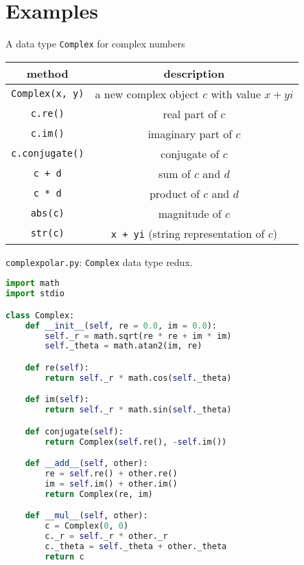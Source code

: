 \documentclass[8pt,a4paper,compress,handout]{beamer}
\begin{document}
\section{Examples}
\begin{frame}[fragile]
A data type \lstinline{Complex} for complex numbers
\begin{center}
\begin{tabular}{cc}
method & description \\ \hline
\lstinline$Complex(x, y)$ & a new complex object $c$ with value $x + yi$ \\
\lstinline$c.re()$ & real part of $c$ \\
\lstinline$c.im()$ & imaginary part of $c$ \\
\lstinline$c.conjugate()$ & conjugate of $c$ \\
\lstinline$c + d$ & sum of $c$ and $d$ \\
\lstinline$c * d$ & product of $c$ and $d$ \\
\lstinline$abs(c)$ & magnitude of $c$ \\
\lstinline$str(c)$ & \lstinline$x + yi$ (string representation of $c$)
\end{tabular} 
\end{center}
\end{frame}

\begin{frame}[fragile]
\begin{framed}
\tiny \lstinline{complexpolar.py}: \lstinline{Complex} data type redux. 
\end{framed}

\begin{lstlisting}[language=Python]
import math
import stdio

class Complex:
    def __init__(self, re = 0.0, im = 0.0):
        self._r = math.sqrt(re * re + im * im)
        self._theta = math.atan2(im, re)

    def re(self):
        return self._r * math.cos(self._theta)

    def im(self):
        return self._r * math.sin(self._theta)

    def conjugate(self):
        return Complex(self.re(), -self.im())

    def __add__(self, other):
        re = self.re() + other.re()
        im = self.im() + other.im()
        return Complex(re, im)

    def __mul__(self, other):
        c = Complex(0, 0)
        c._r = self._r * other._r
        c._theta = self._theta + other._theta
        return c
\end{lstlisting}
\end{frame}
\end{document}
